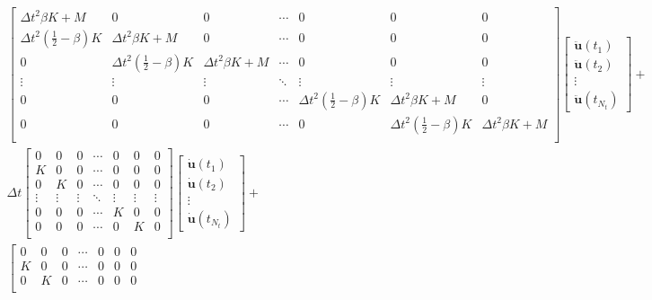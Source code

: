 \documentclass[a4paper, 10pt]{article}
\begin{document}
\begin{align*}
\left[
\begin{array}{ccccccc}
\Delta t^2 \beta K + M & 0 & 0  &\cdots & 0 & 0 & 0 \\
\Delta t^2 \left( \frac{1}{2} - \beta \right) K & \Delta t^2 \beta K + M & 0 & \cdots & 0 & 0 & 0 \\
0 & \Delta t^2 \left( \frac{1}{2} - \beta \right) K & \Delta t^2 \beta K + M & \cdots & 0 & 0 & 0 \\
\vdots & \vdots & \vdots & \ddots & \vdots & \vdots & \vdots \\
0 & 0 & 0 & \cdots & \Delta t^2 \left( \frac{1}{2} - \beta \right) K & \Delta t^2 \beta K + M & 0 \\
0 & 0 & 0 & \cdots & 0 & \Delta t^2 \left( \frac{1}{2} - \beta \right) K  & \Delta t^2 \beta K + M \\
\end{array}
\right]\left[
\begin{array}{c}
\ddot{\mathbf{u}}(t_1)\\
\ddot{\mathbf{u}}(t_2) \\
\vdots \\
\ddot{\mathbf{u}}(t_{N_t}) 
\end{array}
\right] +  \\
\Delta t \left[
\begin{array}{ccccccc}
0 & 0 & 0  &\cdots & 0 & 0 & 0 \\
 K & 0 & 0 & \cdots & 0 & 0 & 0 \\
0 & K & 0 & \cdots & 0 & 0 & 0 \\
\vdots & \vdots & \vdots & \ddots & \vdots & \vdots & \vdots \\
0 & 0 & 0 & \cdots & K & 0 & 0 \\
0 & 0 & 0 & \cdots & 0 & K  & 0 \\
\end{array}
\right]\left[
\begin{array}{c}
\dot{\mathbf{u}}(t_1)\\
\dot{\mathbf{u}}(t_2) \\
\vdots \\
\dot{\mathbf{u}}(t_{N_t}) 
\end{array}
\right] + \\
\left[
\begin{array}{ccccccc}
0 & 0 & 0  &\cdots & 0 & 0 & 0 \\
 K & 0 & 0 & \cdots & 0 & 0 & 0 \\
0 & K & 0 & \cdots & 0 & 0 & 0 \\

\end{array}
\end{align*}
\end{document}
